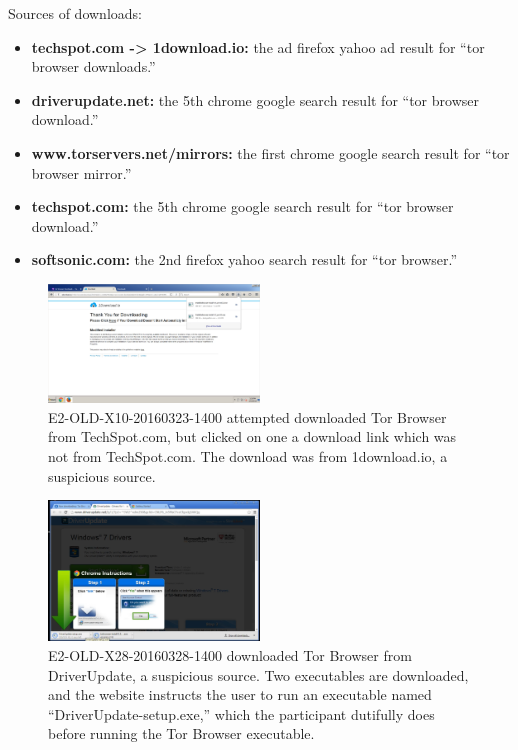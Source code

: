 \documentclass[USenglish,oneside,twocolumn]{article}
\begin{document}
Sources of downloads: 
\begin{itemize}
\item {\bfseries techspot.com -> 1download.io:} the ad firefox yahoo ad result for ``tor browser downloads.'' 
\item {\bfseries driverupdate.net:} the 5th chrome google search result for ``tor browser download.'' 
\item {\bfseries www.torservers.net/mirrors:} the first chrome google search result for ``tor browser mirror.''
\item {\bfseries techspot.com:} the 5th chrome google search result for ``tor browser download.''
\item {\bfseries softsonic.com:} the 2nd firefox yahoo search result for ``tor browser.''
\end{itemize}

\begin{figure}[h]
\includegraphics[width=0.5\textwidth]{../experiment/processing/bad-participants/X10-20160323-132505-1downloadio.png}
\caption{E2-OLD-X10-20160323-1400 attempted downloaded Tor Browser from TechSpot.com, but clicked on one 
a download link which was not from TechSpot.com. The download was from 1download.io, a suspicious source.}
\label{downloadio}
\end{figure} 

\begin{figure}[h]
\includegraphics[width=0.5\textwidth]{../experiment/processing/bad-participants/X28-20160328-134111-driverupdate.png}
\caption{E2-OLD-X28-20160328-1400 downloaded Tor Browser from DriverUpdate, a suspicious source. Two executables
are downloaded, and the website instructs the user to run an executable named ``DriverUpdate-setup.exe,'' which the
participant dutifully does before running the Tor Browser executable.}
\label{driverupdate}
\end{figure} 
\end{document}
